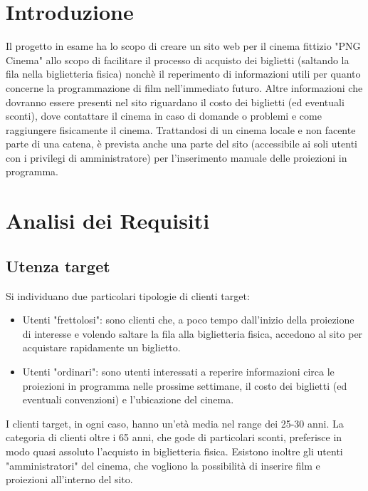 \documentclass[a4paper, 12pt]{article}
\begin{document}
\makefrontpage
\tableofcontents
\clearpage

\section{Introduzione}
Il progetto in esame ha lo scopo di creare un sito web per il cinema fittizio "PNG Cinema" allo scopo di facilitare il processo di acquisto dei biglietti (saltando la fila nella biglietteria fisica) nonchè
il reperimento di informazioni utili per quanto concerne la programmazione di film nell'immediato futuro.
Altre informazioni che dovranno essere presenti nel sito riguardano il costo dei biglietti (ed eventuali sconti), dove contattare il cinema in caso di domande o problemi e come raggiungere fisicamente il cinema.
Trattandosi di un cinema locale e non facente parte di una catena, è prevista anche una parte del sito (accessibile ai soli utenti con i privilegi di amministratore) per l'inserimento manuale delle proiezioni in programma.

\section{Analisi dei Requisiti}
\subsection{Utenza target}
Si individuano due particolari tipologie di clienti target:
\begin{itemize}
    \item Utenti "frettolosi": sono clienti che, a poco tempo dall'inizio della proiezione di interesse e volendo saltare la fila alla biglietteria fisica, accedono al sito per acquistare rapidamente un biglietto.
    \\\item Utenti "ordinari": sono utenti interessati a reperire informazioni circa le proiezioni in programma nelle prossime settimane, il costo dei biglietti (ed eventuali convenzioni) e l'ubicazione del cinema.
\end{itemize}
I clienti target, in ogni caso, hanno un'età media nel range dei 25-30 anni. La categoria di clienti oltre i 65 anni, che gode di particolari sconti, preferisce in modo quasi assoluto l'acquisto in biglietteria fisica.
Esistono inoltre gli utenti "amministratori" del cinema, che vogliono la possibilità di inserire film e proiezioni all'interno del sito.
\end{document}
